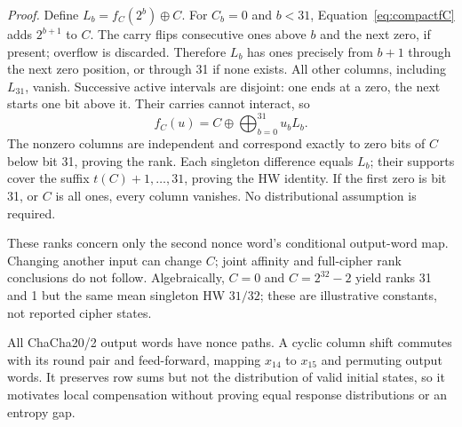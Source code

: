 \emph{Proof.} Define $L_b=f_C(2^b)\oplus C$. For $C_b=0$ and $b<31$, Equation~\eqref{eq:compactfC} adds $2^{b+1}$ to $C$. The carry flips consecutive ones above $b$ and the next zero, if present; overflow is discarded. Therefore $L_b$ has ones precisely from $b+1$ through the next zero position, or through 31 if none exists. All other columns, including $L_{31}$, vanish. Successive active intervals are disjoint: one ends at a zero, the next starts one bit above it. Their carries cannot interact, so
\[
 f_C(u)=C\oplus\bigoplus_{b=0}^{31}u_bL_b.
\]
The nonzero columns are independent and correspond exactly to zero bits of $C$ below bit 31, proving the rank. Each singleton difference equals $L_b$; their supports cover the suffix $t(C)+1,\ldots,31$, proving the HW identity. If the first zero is bit 31, or $C$ is all ones, every column vanishes. No distributional assumption is required.

These ranks concern only the second nonce word's conditional output-word map. Changing another input can change $C$; joint affinity and full-cipher rank conclusions do not follow. Algebraically, $C=0$ and $C=2^{32}-2$ yield ranks 31 and 1 but the same mean singleton HW $31/32$; these are illustrative constants, not reported cipher states.

All ChaCha20/2 output words have nonce paths. A cyclic column shift commutes with its round pair and feed-forward, mapping $x_{14}$ to $x_{15}$ and permuting output words. It preserves row sums but not the distribution of valid initial states, so it motivates local compensation without proving equal response distributions or an entropy gap.
